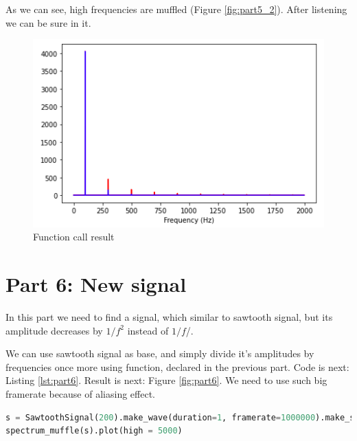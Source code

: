 \documentclass[a4paper]{article}
\begin{document}
            As we can see, high frequencies are muffled (Figure \ref{fig:part5_2}). After listening we can be sure in it.
            
            \begin{figure}[H]
                \centering
                \includegraphics[width=\textwidth]{img/spec_muffle.png}
                \caption{Function call result}
                \label{fig:part5_1}
            \end{figure}
            
    \newpage
        \section{Part 6: New signal}
        
            In this part we need to find a signal, which similar to sawtooth signal, but its amplitude decreases by $1/f^2$ instead of $1/f$/.
            
            We can use sawtooth signal as base, and simply divide it's amplitudes by frequencies once more using function, declared in the previous part. Code is next: Listing \ref{lst:part6}. Result is next: Figure \ref{fig:part6}. We need to use such big framerate because of aliasing effect.
            
            \begin{lstlisting}[language=Python,caption=Signal and spectrum creation,label={lst:part5_1}]
s = SawtoothSignal(200).make_wave(duration=1, framerate=1000000).make_spectrum()
spectrum_muffle(s).plot(high = 5000)
            \end{lstlisting}
            
\end{document}

